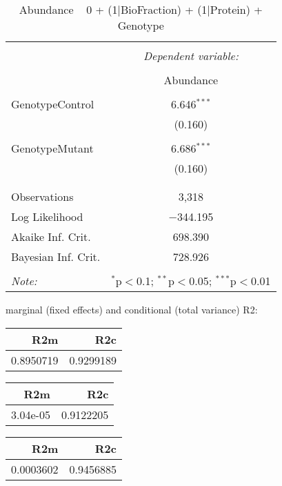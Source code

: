 \documentclass[11pt]{report}
\begin{document}
\begin{table}[!htbp] \centering 
  \caption{Abundance ~ 0 + (1|BioFraction) + (1|Protein) + Genotype} 
  \label{} 
\begin{tabular}{@{\extracolsep{5pt}}lc} 
\\[-1.8ex]\hline 
\hline \\[-1.8ex] 
 & \multicolumn{1}{c}{\textit{Dependent variable:}} \\ 
\cline{2-2} 
\\[-1.8ex] & Abundance \\ 
\hline \\[-1.8ex] 
 GenotypeControl & 6.646$^{***}$ \\ 
  & (0.160) \\ 
  & \\ 
 GenotypeMutant & 6.686$^{***}$ \\ 
  & (0.160) \\ 
  & \\ 
\hline \\[-1.8ex] 
Observations & 3,318 \\ 
Log Likelihood & $-$344.195 \\ 
Akaike Inf. Crit. & 698.390 \\ 
Bayesian Inf. Crit. & 728.926 \\ 
\hline 
\hline \\[-1.8ex] 
\textit{Note:}  & \multicolumn{1}{r}{$^{*}$p$<$0.1; $^{**}$p$<$0.05; $^{***}$p$<$0.01} \\ 
\end{tabular} 
\end{table} 
marginal (fixed effects) and conditional (total variance) R2:

\begin{tabular}{r|r}
\hline
R2m & R2c\\
\hline
0.8950719 & 0.9299189\\
\hline
\end{tabular}

\begin{tabular}{r|r}
\hline
R2m & R2c\\
\hline
3.04e-05 & 0.9122205\\
\hline
\end{tabular}

\begin{tabular}{r|r}
\hline
R2m & R2c\\
\hline
0.0003602 & 0.9456885\\
\hline
\end{tabular}
\end{document}

